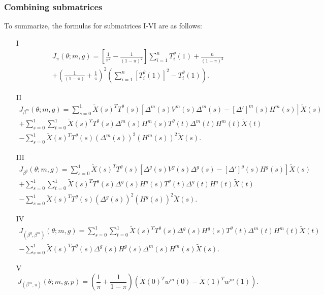 \documentclass[12pt]{article}
\begin{document}
\begin{appendices}
\begin{refsection}
		\subsubsection*{Combining submatrices}
		To summarize, the formulas for submatrices I-VI are as follows:
		\begin{itemize}
			\item[I]\begin{multline*}
			J_\pi(\theta; m, g) = 
			\left[ \frac{1}{\pi^2} - \frac{1}{(1 - \pi )^2} \right] \sum_{i=1}^n T^\theta_i(1) + \frac{n}{(1-\pi )^2} \\ + \left( \frac{1}{(1 - \pi )} + \frac{1}{\pi} \right)^2 \left( \sum_{i=1}^n [T^\theta_i(1)]^2 - T^\theta_i(1) \right).
			\end{multline*}
			\item[II] \begin{multline*}
			J_{\beta^m}(\theta; m, g) = \sum_{s=0}^1 \tilde{X}(s)^T T^{\theta}(s) \left[ {\Delta}^m(s) {V}^m(s) {\Delta}^m(s) - [{\Delta}']^m(s) {H}^m(s) \right] \tilde{X}(s) \\ + \sum_{s=0}^1 \sum_{t=0}^1 \tilde{X}(s)^T {T}^\theta(s) {\Delta}^m(s) {H}^m(s) {T}^\theta(t) {\Delta}^m(t) {H}^m(t) \tilde{X}(t) \\ - \sum_{s=0}^1 \tilde{X}(s)^T T^{\theta}(s) ({\Delta}^m(s))^2 ({H}^m(s))^2 \tilde{X}(s).
			\end{multline*}
			\item[III] \begin{multline*}
			J_{\beta^g}(\theta; m, g) = \sum_{s=0}^1 \tilde{X}(s)^T T^{\theta}(s) \left[{\Delta}^g(s) {V}^g(s) {\Delta}^g(s) - [{\Delta}']^g(s) {H}^g(s) \right] \tilde{X}(s) \\ + \sum_{s=0}^1 \sum_{t=0}^1 \tilde{X}(s)^T {T}^\theta(s) {\Delta}^g(s) {H}^g(s) {T}^\theta(t) {\Delta}^g(t) {H}^g(t) \tilde{X}(t) \\ - \sum_{s=0}^1 \tilde{X}(s)^T T^{\theta}(s) ({\Delta}^g(s))^2 ({H}^g(s))^2 \tilde{X}(s).
			\end{multline*}
			\item[IV] \begin{multline*}
			J_{(\beta^g, \beta^m)}(\theta; m, g) = \sum_{s=0}^1 \sum_{t=0}^1 \tilde{X}(s)^T  T^\theta(s) {\Delta}^g(s) {H}^g(s) T^\theta(t){\Delta}^m(t) {H}^m(t) \tilde{X}(t) \\ - \sum_{s=0}^1 \tilde{X}(s)^T T^\theta(s) {\Delta}^g(s) {H}^g(s) {\Delta}^m(s) {H}^m(s) \tilde{X}(s).
			\end{multline*}
			\item[V] $$ J_{(\beta^m, \pi)}(\theta; m, g, p) = \left( \frac{1}{\pi} + \frac{1}{1 - \pi} \right) \left( \tilde{X}(0)^T w^m(0) - \tilde{X}(1)^T w^m(1)\right).  $$

\end{itemize}
\end{refsection}
\end{appendices}
\end{document}
